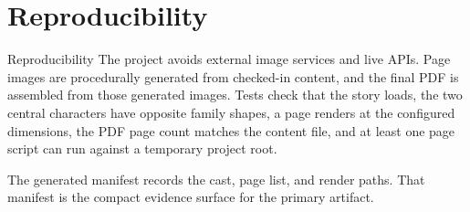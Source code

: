 \documentclass[
  ignorenonframetext,
]{beamer}
\author{\texorpdfstring{}{}}
\date{}
\begin{document}
\section{Reproducibility}\label{reproducibility}

\begin{frame}[allowframebreaks]{Reproducibility}
The project avoids external image services and live APIs. Page images
are procedurally generated from checked-in content, and the final PDF is
assembled from those generated images. Tests check that the story loads,
the two central characters have opposite family shapes, a page renders
at the configured dimensions, the PDF page count matches the content
file, and at least one page script can run against a temporary project
root.

The generated manifest records the cast, page list, and render paths.
That manifest is the compact evidence surface for the primary artifact.
\end{frame}
\end{document}
